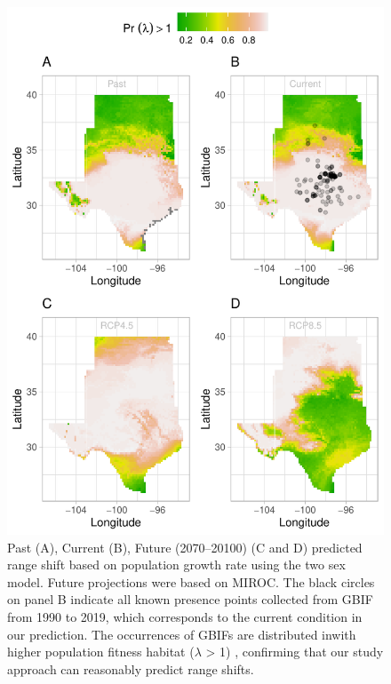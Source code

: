 \documentclass[12pt]{article}
\begin{document}
\begin{figure}%
  \begin{center}
    \includegraphics[width=0.78\linewidth]{Figures/Fig_geoPrlambdaprojection.pdf}
  \caption{Past (A), Current (B), Future (2070–20100) (C and D) predicted range shift based on population growth rate using the two sex model. Future projections were based on MIROC. The black circles on panel B indicate all known presence points collected from GBIF from 1990 to 2019, which corresponds to the current condition in our prediction.  The occurrences of GBIFs are distributed inwith higher population fitness habitat ($\lambda$ > 1) , confirming that our study approach can reasonably predict range shifts. }
  \label{fig:geoproj}
  \end{center}
\end{figure}
\end{document}
